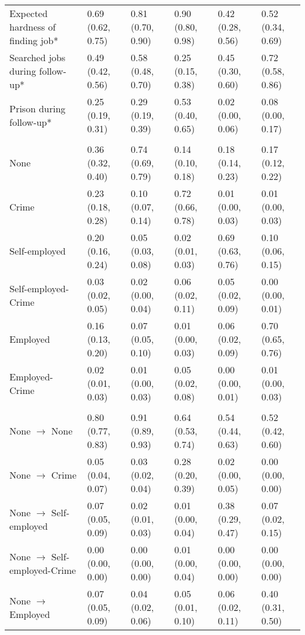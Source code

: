 \begin{scriptsize}
{\begin{longtable}{llllll}
  \quad Expected hardness of finding job* & 0.69 (0.62, 0.75) & 0.81 (0.70, 0.90) & 0.90 (0.80, 0.98) & 0.42 (0.28, 0.56) & 0.52 (0.34, 0.69) \\ 
  \quad Searched jobs during follow-up* & 0.49 (0.42, 0.56) & 0.58 (0.48, 0.70) & 0.25 (0.15, 0.38) & 0.45 (0.30, 0.60) & 0.72 (0.58, 0.86) \\ 
  \quad Prison during follow-up* & 0.25 (0.19, 0.31) & 0.29 (0.19, 0.39) & 0.53 (0.40, 0.65) & 0.02 (0.00, 0.06) & 0.08 (0.00, 0.17) \\ 
  \addlinespace[12pt]
\multicolumn{6}{l}{\textbf{Time spent in states (proportion)}} \\
\addlinespace
\quad None & 0.36 (0.32, 0.40) & 0.74 (0.69, 0.79) & 0.14 (0.10, 0.18) & 0.18 (0.14, 0.23) & 0.17 (0.12, 0.22) \\ 
  \quad Crime & 0.23 (0.18, 0.28) & 0.10 (0.07, 0.14) & 0.72 (0.66, 0.78) & 0.01 (0.00, 0.03) & 0.01 (0.00, 0.03) \\ 
  \quad Self-employed & 0.20 (0.16, 0.24) & 0.05 (0.03, 0.08) & 0.02 (0.01, 0.03) & 0.69 (0.63, 0.76) & 0.10 (0.06, 0.15) \\ 
  \quad Self-employed-Crime & 0.03 (0.02, 0.05) & 0.02 (0.00, 0.04) & 0.06 (0.02, 0.11) & 0.05 (0.02, 0.09) & 0.00 (0.00, 0.01) \\ 
  \quad Employed & 0.16 (0.13, 0.20) & 0.07 (0.05, 0.10) & 0.01 (0.00, 0.03) & 0.06 (0.02, 0.09) & 0.70 (0.65, 0.76) \\ 
  \quad Employed-Crime & 0.02 (0.01, 0.03) & 0.01 (0.00, 0.03) & 0.05 (0.02, 0.08) & 0.00 (0.00, 0.01) & 0.01 (0.00, 0.03) \\ 
  \addlinespace[12pt]
\multicolumn{6}{l}{\textbf{Transition rates}} \\
\quad None $\rightarrow$ None & 0.80 (0.77, 0.83) & 0.91 (0.89, 0.93) & 0.64 (0.53, 0.74) & 0.54 (0.44, 0.63) & 0.52 (0.42, 0.60) \\ 
  \quad None $\rightarrow$ Crime & 0.05 (0.04, 0.07) & 0.03 (0.02, 0.04) & 0.28 (0.20, 0.39) & 0.02 (0.00, 0.05) & 0.00 (0.00, 0.00) \\ 
  \quad None $\rightarrow$ Self-employed & 0.07 (0.05, 0.09) & 0.02 (0.01, 0.03) & 0.01 (0.00, 0.04) & 0.38 (0.29, 0.47) & 0.07 (0.02, 0.15) \\ 
  \quad None $\rightarrow$ Self-employed-Crime & 0.00 (0.00, 0.00) & 0.00 (0.00, 0.00) & 0.01 (0.00, 0.04) & 0.00 (0.00, 0.00) & 0.00 (0.00, 0.00) \\ 
  \quad None $\rightarrow$ Employed & 0.07 (0.05, 0.09) & 0.04 (0.02, 0.06) & 0.05 (0.01, 0.10) & 0.06 (0.02, 0.11) & 0.40 (0.31, 0.50) \\ 

\end{longtable}}
\end{scriptsize}
